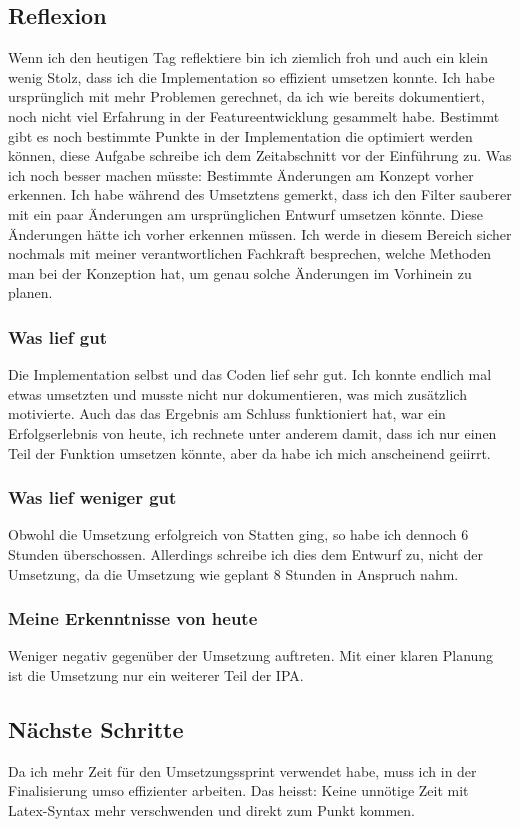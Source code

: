 \subsection*{Reflexion}
Wenn ich den heutigen Tag reflektiere bin ich ziemlich froh und auch ein klein wenig Stolz, dass ich die Implementation
so effizient umsetzen konnte. Ich habe ursprünglich mit mehr Problemen gerechnet, da ich wie bereits dokumentiert, noch nicht
viel Erfahrung in der Featureentwicklung gesammelt habe. Bestimmt gibt es noch bestimmte Punkte in der Implementation die optimiert werden können,
diese Aufgabe schreibe ich dem Zeitabschnitt vor der Einführung zu. Was ich noch besser machen müsste: Bestimmte Änderungen
am Konzept vorher erkennen. Ich habe während des Umsetztens gemerkt, dass ich den Filter sauberer mit ein paar Änderungen am ursprünglichen Entwurf 
umsetzen könnte. Diese Änderungen hätte ich vorher erkennen müssen. Ich werde in diesem Bereich sicher nochmals mit meiner verantwortlichen
Fachkraft besprechen, welche Methoden man bei der Konzeption hat, um genau solche Änderungen im Vorhinein zu planen.

\subsubsection*{Was lief gut}
Die Implementation selbst und das Coden lief sehr gut. Ich konnte endlich mal etwas umsetzten und musste nicht nur dokumentieren, was mich
zusätzlich motivierte. Auch das das Ergebnis am Schluss funktioniert hat, war ein Erfolgserlebnis von heute, ich rechnete unter anderem damit, dass ich
nur einen Teil der Funktion umsetzen könnte, aber da habe ich mich anscheinend geiirrt.

\subsubsection*{Was lief weniger gut}
Obwohl die Umsetzung erfolgreich von Statten ging, so habe ich dennoch 6 Stunden überschossen. Allerdings schreibe ich dies dem Entwurf zu,
nicht der Umsetzung, da die Umsetzung wie geplant 8 Stunden in Anspruch nahm.

\subsubsection*{Meine Erkenntnisse von heute}
Weniger negativ gegenüber der Umsetzung auftreten. Mit einer klaren Planung ist die Umsetzung nur ein weiterer Teil der IPA. 

\subsection*{Nächste Schritte}
Da ich mehr Zeit für den Umsetzungssprint verwendet habe, muss ich in der Finalisierung umso effizienter arbeiten. Das heisst: Keine unnötige Zeit
mit Latex-Syntax mehr verschwenden und direkt zum Punkt kommen.

\pagebreak
